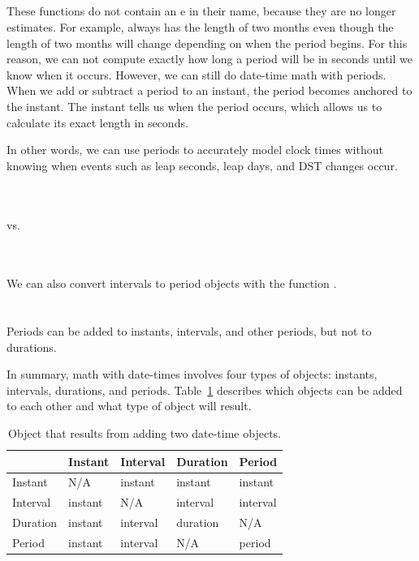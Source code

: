 \documentclass[article]{jss}
\begin{document}
\\
\\

\\
\\

These functions do not contain an e in their name, because they are no longer estimates. For example,  always has the length of two months even though the length of two months will change depending on when the period begins. For this reason, we can not compute exactly how long a period will be in seconds until we know when it occurs. However, we can still do date-time math with periods. When we add or subtract a period to an instant, the period becomes anchored to the instant. The instant tells us when the period occurs, which allows us to calculate its exact length in seconds. 

In other words, we can use periods to accurately model clock times without knowing when events such as leap seconds, leap days, and DST changes occur.

\\
\\

vs.

\\
\\

We can also convert intervals to period objects with the function .\\

\\
\\

Periods can be added to instants, intervals, and other periods, but not to durations.


In summary, math with date-times involves four types of objects: instants, intervals, durations, and periods. Table~\ref{tbl:date-math} describes which objects can be added to each other and what type of object will result.

\begin{table}
  \begin{center}
  \begin{tabular}{l|llll}
  & Instant & Interval & Duration & Period\\
  \hline
  Instant & N/A & instant & instant & instant\\
  Interval & instant & N/A & interval & interval\\
  Duration & instant & interval & duration & N/A\\
  Period & instant & interval & N/A & period\\
  \hline
    
  \end{tabular}
  \end{center}
  \caption{Object that results from adding two date-time objects.}
  \label{tbl:date-math}
\end{table}
\end{document}
